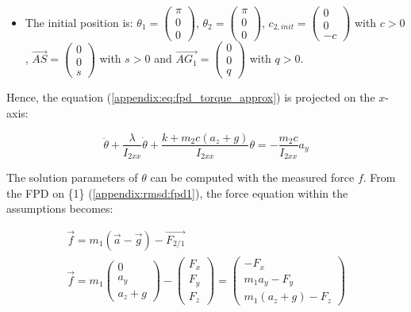 \documentclass[\main/main.tex]{subfiles}
\begin{document}
\begin{itemize}
 \item The initial position is: $\theta_1 =
       \begin{pmatrix}
        \pi \\
        0 \\
        0
       \end{pmatrix}$, $\theta_2 =
       \begin{pmatrix}
        \pi \\
        0 \\
        0
       \end{pmatrix}$, $c_{2, init} =
       \begin{pmatrix}
        0 \\
        0 \\
        -c
       \end{pmatrix}$ with $c > 0$, $\overrightarrow{AS} =
       \begin{pmatrix}
        0  \\
        0  \\
        s
       \end{pmatrix}$ with $s > 0$ and $\overrightarrow{AG_1} =
       \begin{pmatrix}
        0  \\
        0  \\
        q
       \end{pmatrix}$ with $q > 0$.

\end{itemize}

Hence, the equation (\ref{appendix:eq:fpd_torque_approx}) is projected on the $x$-axis:

\begin{equation*}
 \ddot{\theta} + \frac{\lambda}{I_{2xx}} \dot{\theta} + \frac{k + m_2 c (a_z + g)}{I_{2xx}} \theta = - \frac{m_2 c}{I_{2xx}} a_y
\end{equation*}

The solution parameters of $\theta$ can be computed with the measured force $f$. From the \ac{FPD} on \{1\} (\ref{appendix:rmsd:fpd1}), the force equation within the assumptions becomes:

\begin{gather}
  \label{appendix:rmsd:eq:fpd1}
 \overrightarrow{f} = m_1 (\overrightarrow{a} - \overrightarrow{g}) - \overrightarrow{F_{2/1}} \\
 \overrightarrow{f} = m_1
 \begin{pmatrix}
  0  \\
  a_y  \\
  a_z + g
 \end{pmatrix}
 - \begin{pmatrix}
 F_x \\
 F_y \\
 F_z
 \end{pmatrix}
 = \begin{pmatrix}
 - F_x \\
 m_1 a_y - F_y \\
 m_1 (a_z + g) - F_z
 \end{pmatrix}
\end{gather}
\end{document}
